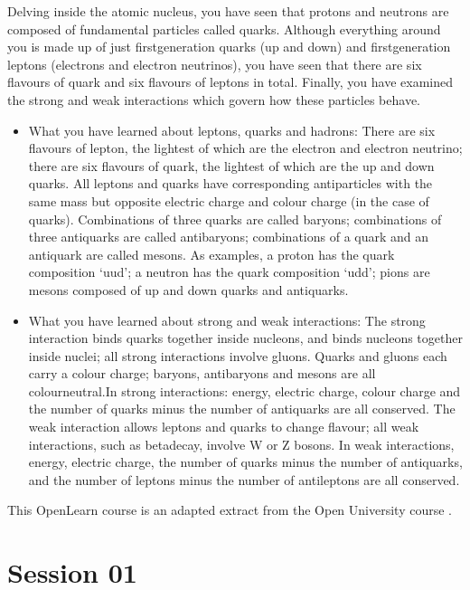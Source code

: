 \documentclass[letterpaper,10pt,english]{sphinxmanual}
\begin{document}
Delving inside the atomic nucleus, you have seen that protons and neutrons are composed of fundamental particles called quarks. Although everything around you is made up of just first\sphinxhyphen{}generation quarks (up and down) and first\sphinxhyphen{}generation leptons (electrons and electron neutrinos), you have seen that there are six flavours of quark and six flavours of leptons in total. Finally, you have examined the strong and weak interactions which govern how these particles behave.
\begin{itemize}
\item {} 
What you have learned about leptons, quarks and hadrons: There are six flavours of lepton, the lightest of which are the electron and electron neutrino; there are six flavours of quark, the lightest of which are the up and down quarks. All leptons and quarks have corresponding antiparticles with the same mass but opposite electric charge and colour charge (in the case of quarks). Combinations of three quarks are called baryons; combinations of three antiquarks are called antibaryons;
combinations of a quark and an antiquark are called mesons. As examples, a proton has the quark composition ‘uud’; a neutron has the quark composition ‘udd’; pions are mesons composed of up and down quarks and antiquarks.

\item {} 
What you have learned about strong and weak interactions: The strong interaction binds quarks together inside nucleons, and binds nucleons together inside nuclei; all strong interactions involve gluons. Quarks and gluons each carry a colour charge; baryons, antibaryons and mesons are all colour\sphinxhyphen{}neutral.In strong interactions: energy, electric charge, colour charge and the number of quarks minus the number of antiquarks are all conserved. The weak interaction allows leptons and quarks to
change flavour; all weak interactions, such as beta\sphinxhyphen{}decay, involve W or Z bosons. In weak interactions, energy, electric charge, the number of quarks minus the number of antiquarks, and the number of leptons minus the number of antileptons are all conserved.

\end{itemize}

This OpenLearn course is an adapted extract from the Open University course .


\section{Session 01}
\label{\detokenize{index:session-01}}
\end{document}
